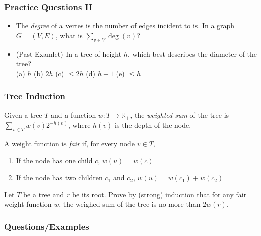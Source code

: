 \documentclass{beamer}
\begin{document}
\begin{frame}[t]
  \frametitle{Practice Questions II}
  \begin{itemize}[<+->]
    \item The \textit{degree} of a vertes is the number of edges incident to is. In a graph $G = (V, E)$, what is $\sum\limits_{v \in V} \deg(v)$?
    \item (Past Examlet) In a tree of height $h$, which best describes the diameter of the tree?\\
      (a) $h$
      (b) $2h$
      (c) $\leq 2h$
      (d) $h + 1$
      (e) $\leq h$
    \begin{center}

    \end{center}
  \end{itemize}
\end{frame}

\begin{frame}[t]
  \frametitle{Tree Induction}
  Given a tree $T$ and a function $w: T \to \mathbb{R}_+$, the \textit{weighted sum} of the tree is $\sum\limits_{v \in T} w(v)2^{-h(v)}$, where $h(v)$ is the depth of the node.

  A weight function is \textit{fair} if, for every node $v \in T$,
  \begin{enumerate}
    \item If the node has one child $c$, $w(u) = w(c)$
    \item If the node has two children $c_1$ and $c_2$, $w(u) = w(c_1) + w(c_2)$
  \end{enumerate}
  Let $T$ be a tree and $r$ be its root. Prove by (strong) induction that for any fair weight function $w$, the weighed sum of the tree is no more than $2w(r)$.
\end{frame}

\begin{frame}
  \frametitle{Questions/Examples}
  \pause
  \pause
  \pause
\end{frame}
\end{document}
